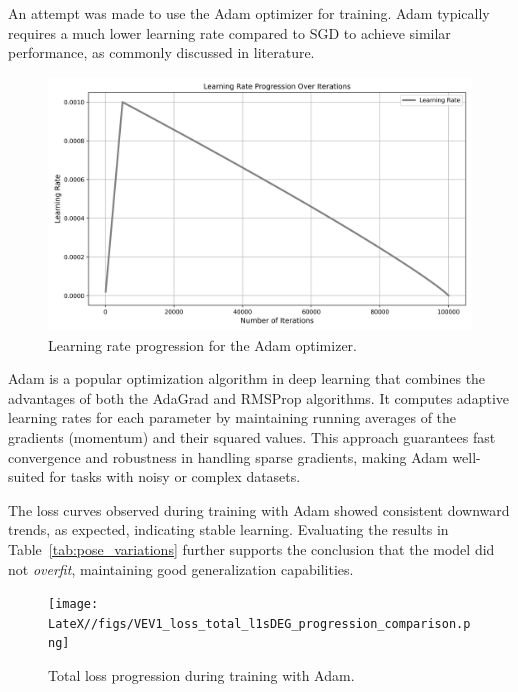 An attempt was made to use the Adam optimizer for training. Adam typically requires a much lower learning rate compared to SGD to achieve similar performance, as commonly discussed in literature. 
\begin{figure}[H]
    \centering
    \includegraphics[width=0.75\linewidth]{BEV2learning_rate_progression.png}
    \caption{Learning rate progression for the Adam optimizer.}
    \label{fig:adam_learning_rate}
\end{figure}

Adam is a popular optimization algorithm in deep learning that combines the advantages of both the AdaGrad and RMSProp algorithms. It computes adaptive learning rates for each parameter by maintaining running averages of the gradients (momentum) and their squared values. This approach guarantees fast convergence and robustness in handling sparse gradients, making Adam well-suited for tasks with noisy or complex datasets.

The loss curves observed during training with Adam showed consistent downward trends, as expected, indicating stable learning. Evaluating the results in Table~\ref{tab:pose_variations} further supports the conclusion that the model did not \textit{overfit}, maintaining good generalization capabilities. 
\begin{figure}[H]
    \centering
    \texttt{[image: LateX//figs/VEV1\_loss\_total\_l1sDEG\_progression\_comparison.png]}
    \caption{Total loss progression during training with Adam.}
    \label{fig:adam_loss_progression}
\end{figure}

